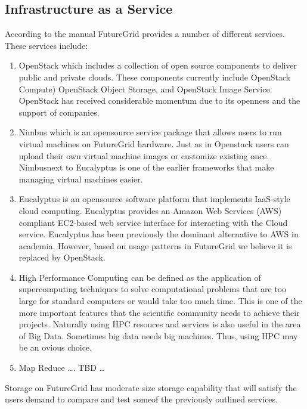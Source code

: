 \subsection{Infrastructure as a Service}



According to the manual FutureGrid provides a number of different
services. These services include:

\begin{enumerate}
\item OpenStack which includes a collection of open source components to deliver public and private clouds. These components currently include OpenStack Compute) OpenStack Object Storage, and OpenStack Image Service. OpenStack has received considerable momentum due to its openness and the support of companies. 

\item Nimbus which is an opensource service package that allows users to run virtual machines on FutureGrid hardware. Just as in Openstack users can upload their own virtual machine images or customize existing once. Nimbusnext to Eucalyptus is one of the earlier frameworks that make managing virtual machines easier.

\item Eucalyptus is an opensource software platform that implements IaaS-style cloud computing. Eucalyptus provides an Amazon Web Services (AWS) compliant EC2-based web service interface for interacting with the Cloud service.  Eucalyptus has been previously the dominant alternative to AWS  in academia. However, based on usage patterns in FutureGrid we believe it is replaced by OpenStack.

\item High Performance Computing can be defined as the application of supercomputing techniques to solve computational problems that are too large for standard computers or would take too much time. This is one of the more important features that the scientific community needs to achieve their projects. Naturally using HPC resouces and services is also useful in the area of Big Data. Sometimes big data needs big machines. Thus, using HPC may be an ovious choice.

\item Map Reduce …. TBD …

\end{enumerate}

Storage on FutureGrid has moderate size storage capability that will satisfy the users demand to compare and test someof the previously outlined services.

